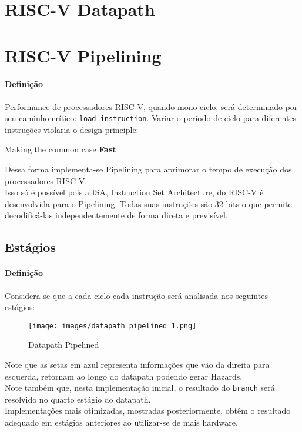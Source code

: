 \documentclass{article}
\begin{document}
\newpage\section{RISC-V Datapath}


\newpage\section{RISC-V Pipelining}
\paragraph{Definição}Performance de processadores RISC-V, quando mono ciclo, será determinado por seu caminho crítico: \texttt{load instruction}. Variar o período de ciclo para diferentes instruções violaria o design principle:
\begin{phrase}
    Making the common case \textbf{Fast}
\end{phrase}
\noindent Dessa forma implementa-se Pipelining para aprimorar o tempo de execução dos processadores RISC-V.\\

\noindent Isso só é possível pois a ISA, Instruction Set Architecture, do RISC-V é desenvolvida para o Pipelining. Todas suas instruções são 32-bits o que permite decodificá-las independentemente de forma direta e previsível.

\subsection{Estágios}
\paragraph{Definição}Considera-se que a cada ciclo cada instrução será analisada nos seguintes estágios:
\begin{figure}[H]
    \centering
    \texttt{[image: images/datapath\_pipelined\_1.png]}
    \caption{Datapath Pipelined}
    \label{datapath_pipelined}
\end{figure}
\noindent Note que as setas em azul representa informações que vão da direita para esquerda, retornam ao longo do datapath podendo gerar Hazards.\\

\noindent Note também que, nesta implementação inicial, o resultado do \texttt{branch} será resolvido no quarto estágio do datapath.\\

\noindent Implementações mais otimizadas, mostradas posteriormente, obtêm o resultado adequado em estágios anteriores ao utilizar-se de mais hardware.
\end{document}
